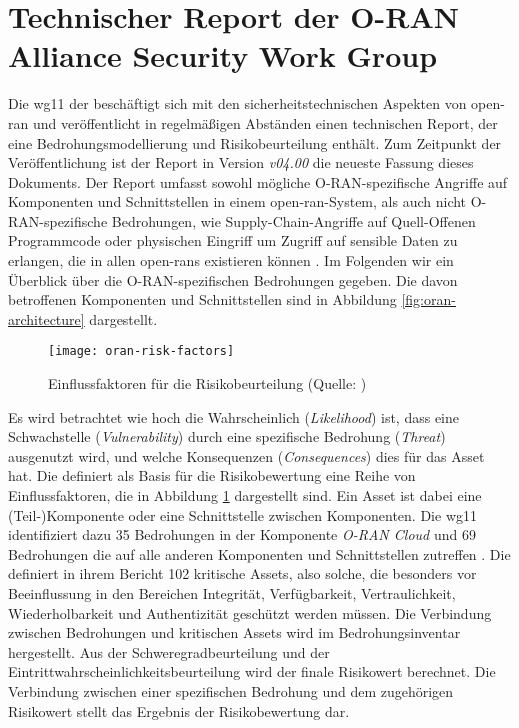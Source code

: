 \section{Technischer Report der O-RAN Alliance Security Work Group}
\label{sec:forschungsstand-wg11}
Die \gls{wg11} der \orana beschäftigt sich mit den sicherheitstechnischen Aspekten von \gls{open-ran} und veröffentlicht in regelmäßigen Abständen einen technischen Report, der eine Bedrohungsmodellierung und Risikobeurteilung enthält. Zum Zeitpunkt der Veröffentlichung ist der Report in Version \textit{\textsf{v04.00}} die neueste Fassung dieses Dokuments. Der Report umfasst sowohl mögliche O-RAN-spezifische Angriffe auf Komponenten und Schnittstellen in einem \gls{open-ran}-System, als auch nicht O-RAN-spezifische Bedrohungen, wie Supply-Chain-Angriffe auf Quell-Offenen Programmcode oder physischen Eingriff um Zugriff auf sensible Daten zu erlangen, die in allen \glspl{open-ran} existieren können \autocite{o-ranworkgroup11securityworkgroupORANSecurityThreat2024}. Im Folgenden wir ein Überblick über die O-RAN-spezifischen Bedrohungen gegeben. Die davon betroffenen Komponenten und Schnittstellen sind in Abbildung \ref{fig:oran-architecture} dargestellt.
\begin{figure}[H]
    \centering
    \texttt{[image: oran-risk-factors]}
    \caption{Einflussfaktoren für die Risikobeurteilung (Quelle: \autocite{o-ranworkgroup11securityworkgroupORANSecurityThreat2024})}
    \label{fig:oran-risk-factors}
\end{figure}
\par Es wird betrachtet wie hoch die Wahrscheinlich (\textit{Likelihood}) ist, dass eine Schwachstelle (\textit{Vulnerability}) durch eine spezifische Bedrohung (\textit{Threat}) ausgenutzt wird, und welche Konsequenzen (\textit{Consequences}) dies für das Asset hat. Die \orana definiert als Basis für die Risikobewertung eine Reihe von Einflussfaktoren, die in Abbildung \ref{fig:oran-risk-factors} dargestellt sind. Ein Asset ist dabei eine (Teil-)Komponente oder eine Schnittstelle zwischen Komponenten. Die \gls{wg11} identifiziert dazu 35 Bedrohungen in der Komponente \textit{O-RAN Cloud} und 69 Bedrohungen die auf alle anderen Komponenten und Schnittstellen zutreffen \autocite{o-ranworkgroup11securityworkgroupORANSecurityThreat2024}. Die \orana definiert in ihrem Bericht 102 kritische Assets, also solche, die besonders vor Beeinflussung in den Bereichen Integrität, Verfügbarkeit, Vertraulichkeit, Wiederholbarkeit und Authentizität geschützt werden müssen. Die Verbindung zwischen Bedrohungen und kritischen Assets wird im Bedrohungsinventar hergestellt. Aus der Schweregradbeurteilung und der Eintrittwahrscheinlichkeitsbeurteilung wird der finale Risikowert berechnet. Die Verbindung zwischen einer spezifischen Bedrohung und dem zugehörigen Risikowert stellt das Ergebnis der Risikobewertung dar.
